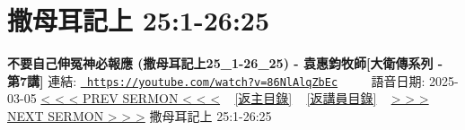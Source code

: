 \documentclass{book}
\begin{document}
\section{撒母耳記上 25:1-26:25}
\label{sec:86NlAlqZbEc}
\textbf{不要自己伸冤神必報應 (撒母耳記上25\_1-26\_25) - 袁惠鈞牧師[大衛傳系列 - 第7講]}
\newline
\newline
連結: \href{https://youtube.com/watch?v=86NlAlqZbEc}{\texttt{ https://youtube.com/watch?v=86NlAlqZbEc}} ~~~~ 語音日期: 2025-03-05 
\newline
\newline
\hyperref[sec:GqTOPwqfjwM]{< < < PREV SERMON < < <}
~
\hyperlink{toc}{[返主目錄]}
~
\hyperref[ch:preacher10]{[返講員目錄]}
~
\hyperref[sec:KIOzsSOi_wU]{> > > NEXT SERMON > > >}
\newline
\newline
撒母耳記上 25:1-26:25
\newline
\end{document}
